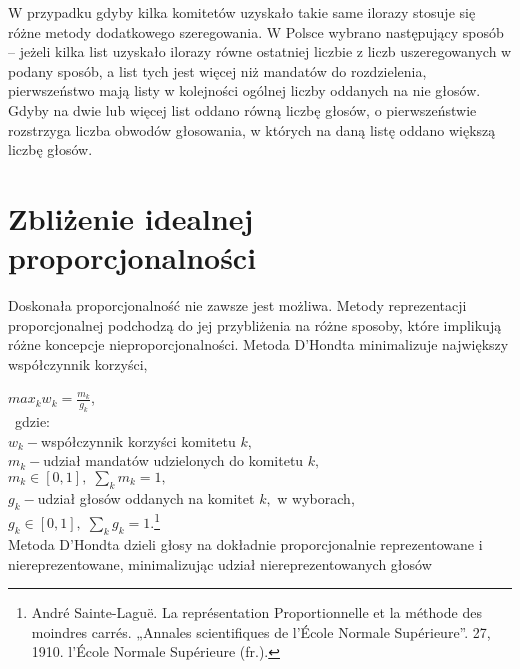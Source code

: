 \documentclass[12pt,a4paper,titlepage]{report}
\begin{document}
W przypadku gdyby kilka komitetów uzyskało takie same ilorazy stosuje się różne metody dodatkowego szeregowania. W Polsce wybrano następujący sposób – jeżeli kilka list uzyskało ilorazy równe ostatniej liczbie z liczb uszeregowanych w podany sposób, a list tych jest więcej niż mandatów do rozdzielenia, pierwszeństwo mają listy w kolejności ogólnej liczby oddanych na nie głosów. Gdyby na dwie lub więcej list oddano równą liczbę głosów, o pierwszeństwie rozstrzyga liczba obwodów głosowania, w których na daną listę oddano większą liczbę głosów.
\section{Zbliżenie idealnej proporcjonalności}
Doskonała proporcjonalność nie zawsze jest możliwa. Metody reprezentacji proporcjonalnej podchodzą do jej przybliżenia na różne sposoby, które implikują różne koncepcje nieproporcjonalności. Metoda D’Hondta minimalizuje największy współczynnik korzyści, 

\begin{math}max_{k}w_{k}={\frac {m_{k}}{g_{k}}}\end{math}, \\ \
gdzie: \\
\begin{math}w_{k}-\end{math}współczynnik korzyści komitetu
\begin{math}k,\end{math} \\
\begin{math}m_{k}-\end{math}udział mandatów udzielonych do komitetu
\begin{math}k,\end{math} \\
\begin{math} m_{k}\in [0,1],\;\sum\limits _{k}m_{k}=1,\end{math} \\
\begin{math}g_{k}-\end{math}udział głosów oddanych na komitet
\begin{math}k,\end{math} w wyborach,\\
\begin{math} g_{k}\in [0,1],\;\sum\limits_{k} g_{k}=1.\end{math}\footnote{André Sainte-Laguë. La représentation Proportionnelle et la méthode des moindres carrés. „Annales scientifiques de l’École Normale Supérieure”. 27, 1910. l’École Normale Supérieure (fr.).} \\
Metoda D’Hondta dzieli głosy na dokładnie proporcjonalnie reprezentowane i niereprezentowane, minimalizując udział niereprezentowanych głosów 
\end{document}
